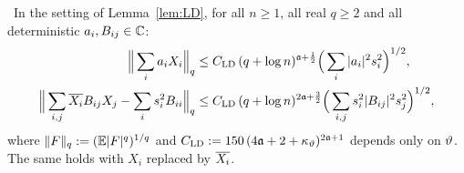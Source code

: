 \begin{lemma}\label{lem:LDmom} \infra\ 
In the setting of Lemma~\ref{lem:LD}, for all $n\ge1$, all real $q\ge2$ and all deterministic $a_i,B_{ij}\in\mathbb{C}$:
\begin{align}
 \Big\|\sum_ia_iX_i\Big\|_q&\le C_{\rm LD}\,(q+\log n)^{\mathfrak{a}+\frac12}\Big(\sum_i|a_i|^2s_i^2\Big)^{1/2},\label{eq:LDm1}\\
 \Big\|\sum_{i,j}\overline{X_i}B_{ij}X_j-\sum_is_i^2B_{ii}\Big\|_q&\le C_{\rm LD}\,(q+\log n)^{2\mathfrak{a}+\frac32}\Big(\sum_{i,j}s_i^2|B_{ij}|^2s_j^2\Big)^{1/2},\label{eq:LDm2}
\end{align}
where $\|F\|_q:=(\mathbb{E}|F|^q)^{1/q}$ and $C_{\rm LD}:=150\,(4\mathfrak{a}+2+\kappa_\vartheta)^{2\mathfrak{a}+1}$ depends only on $\vartheta$. The same holds with $X_i$ replaced by $\overline{X_i}$.
\end{lemma}
